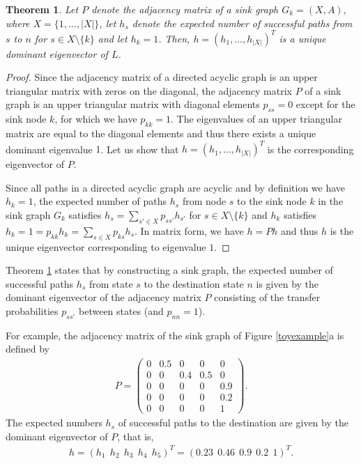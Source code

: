 \documentclass[dissertation,draft*]{aaltoseries}
\newtheorem{theorem}{Theorem}
\begin{document}
\begin{theorem}
\label{polut2}
Let $P$ denote the adjacency matrix of a sink graph $G_k=(X,A)$, where $X=\{1,\ldots,|X|\}$,  
let $h_s$ denote the expected number of successful paths from $s$ to $n$ for $s \in X \setminus \{k\}$ and let $h_k=1$. 
Then, $h=(h_1,\ldots,h_{|X|})^T$ is a unique dominant eigenvector of $L$.
\end{theorem}
\begin{proof}
 Since the adjacency matrix of a directed acyclic graph is an upper triangular matrix with zeros on the diagonal,
the adjacency matrix $P$ of a sink graph is an upper triangular matrix with diagonal elements $p_{ss}=0$ except 
for the sink node $k$, for which we have $p_{kk} = 1$. The eigenvalues of an upper triangular matrix are equal to the
diagonal elements \cite{axler} and thus there exists a unique dominant eigenvalue $1$. Let us show that $h=(h_1,\ldots,h_{|X|})^T$ 
is the corresponding eigenvector of $P$.  

Since all paths in a directed acyclic graph are acyclic and by definition we have $h_k=1$, 
the expected number of paths $h_s$ from node $s$ to the sink node $k$ in the sink graph $G_k$ satisfies
$h_s = \sum_{s' \in X} p_{ss'} h_{s'}$
for $s \in X \setminus \{k\}$ and $h_k$ satisfies $h_k= 1 = p_{kk} h_k = \sum_{s \in X} p_{ks} h_s$.
In matrix form, we have $h = Ph$ and thus $h$ is the unique eigenvector corresponding to eigenvalue $1$.
\end{proof}

Theorem \ref{polut2} states that by constructing a sink graph, the expected number of successful paths $h_s$ from state 
$s$ to the destination state $n$
is given by the dominant eigenvector of the adjacency matrix $P$ consisting of the transfer probabilities $p_{ss'}$
between states (and $p_{nn}=1$). 

For example, the adjacency matrix of the sink graph of Figure \ref{toyexample}a is defined by
 \begin{align*}
P=
\left(
\begin{array}{ccccc}
 0 & 0.5 & 0 & 0 & 0 \\
 0 & 0 & 0.4 & 0.5 & 0 \\
 0 & 0 & 0 & 0 & 0.9 \\
 0 & 0 & 0 & 0 & 0.2 \\
 0 & 0 & 0 & 0 & 1
\end{array}
\right).
\end{align*}
The expected numbers $h_s$ of successful paths to the destination are given by the dominant eigenvector of $P$, that is,
\begin{align*}
 h= (h_1 \ \ h_2 \ \ h_3 \ \ h_4 \ \ h_5)^T = (0.23 \ \ 0.46 \ \ 0.9 \ \ 0.2 \ \ 1 )^T.
\end{align*}
\end{document}
